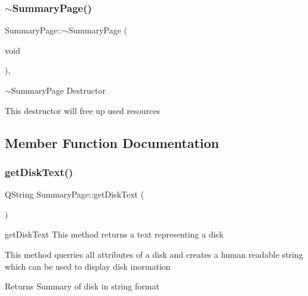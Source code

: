 \subsubsection{\texorpdfstring{$\sim$\+Summary\+Page()}{~SummaryPage()}}
{\footnotesize\ttfamily Summary\+Page\+::$\sim$\+Summary\+Page (\begin{DoxyParamCaption}\item[{void}]{ }\end{DoxyParamCaption})\hspace{0.3cm}{\ttfamily [override]}, {\ttfamily [virtual]}}



$\sim$\+Summary\+Page Destructor 

This destructor will free up used resources 

\subsection{Member Function Documentation}
\mbox{\label{classui_1_1wizard_1_1pages_1_1_summary_page_af31d12dc5ed2c917c8f65fe7790b661f}} 
\subsubsection{\texorpdfstring{get\+Disk\+Text()}{getDiskText()}}
{\footnotesize\ttfamily Q\+String Summary\+Page\+::get\+Disk\+Text (\begin{DoxyParamCaption}{ }\end{DoxyParamCaption})\hspace{0.3cm}{\ttfamily [private]}}



get\+Disk\+Text This method returns a text representing a disk 

This method querries all attributes of a disk and creates a human readable string which can be used to display disk inormation \begin{DoxyReturn}{Returns}
Summary of disk in string format 
\end{DoxyReturn}
\mbox{\label{classui_1_1wizard_1_1pages_1_1_summary_page_a0100c8e2a029708c5447c20c83bd7257}} 
